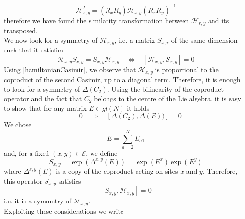 \documentclass[11pt]{article}
\numberwithin{equation}{section}
\numberwithin{equation}{subsection}
\begin{document}
\begin{equation}\label{transpositionPropertyH}
    \mathcal{H}_{x,y}^{T}=\left(R_{x}R_{y}\right)\mathcal{H}_{x,y}\left(R_{x}R_{y}\right)^{-1}
\end{equation}
therefore we have found the similarity transformation between $\mathcal{H}_{x,y}$ and its transposed. \\
We now look for a symmetry of $\mathcal{H}_{x,y}$, i.e. a matrix $S_{x,y}$ of the same dimension such that it satisfies 
\begin{equation}
	\mathcal{H}_{x,y}S_{x,y}=S_{x,y}\mathcal{H}_{x,y}\quad \Leftrightarrow \quad [\mathcal{H}_{x,y},S_{x,y}]=0
\end{equation}
Using \eqref{hamiltonianCasimir}, we observe that $\mathcal{H}_{x,y}$ is proportional to the coproduct of the second Casimir, up to a diagonal term. Therefore, it is enough to look for a symmetry of $\Delta (C_{2})$. Using the bilinearity of the coproduct operator and the fact that $C_{2}$ belongs to the centre of the Lie algebra, it is easy to show that for any matrix $E\in gl(N)$ it holds
\begin{equation}
	[C_{2},E]=0\quad \Rightarrow\quad \left[\Delta (C_{2}),\Delta(E)) \right]=0
\end{equation}
We chose 
\begin{equation}
	E=\sum_{a=2}^{N}E_{a1}
\end{equation}
and, for a fixed $(x,y)\in \mathcal{E}$, we define
\begin{equation}
	S_{x,y}=\exp{(\Delta^{x,y}(E))}=\exp{(E^{x})}\exp{(E^{y})}
\end{equation}
where $\Delta^{x,y}(E)$ is a copy of the coproduct acting on sites $x$ and $y$. Therefore, this operator $S_{x,y}$ satisfies
\begin{equation}\label{symmetryH}
	\left[S_{x,y},\mathcal{H}_{x,y}\right]=0
\end{equation}
i.e. it is a symmetry of $\mathcal{H}_{x,y}$. \\ Exploiting these considerations we write
\end{document}
